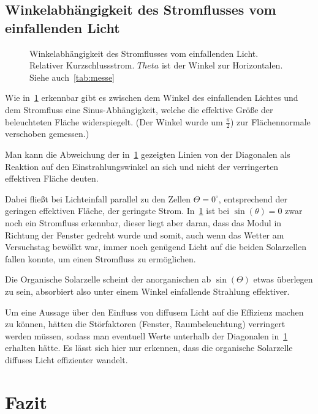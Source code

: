 \documentclass[slug=SZ, room=Hermann-Krone-Bau\,\ Labor\ 1.25,
supervisor=Martin\ Kroll, coursedate=14.\ 11.\ 2019]{../../Lab_Report_LaTeX/lab_report}
\begin{document}
\subsection{Winkelabhängigkeit des Stromflusses vom einfallenden Licht}
\label{sec:winkel}

\begin{figure}[H]\centering
        
        \caption{Winkelabhängigkeit des Stromflusses vom einfallenden
          Licht. Relativer Kurzschlussstrom. \(Theta\)  ist der Winkel
          zur Horizontalen. Siehe auch~\ref{tab:messe}}
        \label{fig:winkel}
\end{figure}

Wie in~\ref{fig:winkel} erkennbar gibt es zwischen dem Winkel des
einfallenden Lichtes und dem Stromfluss eine Sinus-Abhängigkeit,
welche die effektive Gr\"o\ss{}e der beleuchteten Fl\"ache
widerspiegelt. (Der Winkel wurde um \(\frac{\pi}{2}\)) zur
Fl\"achennormale verschoben gemessen.)

Man kann die Abweichung der in~\ref{fig:winkel} gezeigten Linien von
der Diagonalen als Reaktion auf den Einstrahlungswinkel an sich und
nicht der verringerten effektiven Fl\"ache deuten.

Dabei flie\ss{}t bei Lichteinfall parallel zu den Zellen
\(\Theta=0^\circ\), entsprechend der geringen effektiven Fl\"ache, der
geringste Strom.
In~\ref{fig:winkel} ist bei \(\sin(\theta) = 0\) zwar noch ein
Stromfluss erkennbar, dieser liegt aber daran, dass das Modul in
Richtung der Fenster gedreht wurde und somit, auch wenn das Wetter am
Versuchstag bewölkt war, immer noch genügend Licht auf die beiden
Solarzellen fallen konnte, um einen Stromfluss zu ermöglichen.

Die Organische Solarzelle scheint der anorganischen ab
\(\sin(\Theta)\) etwas \"uberlegen
zu sein, absorbiert also unter einem Winkel einfallende Strahlung
effektiver.

Um eine Aussage \"uber den Einfluss von diffusem Licht auf die
Effizienz machen zu k\"onnen, h\"atten die St\"orfaktoren (Fenster,
Raumbeleuchtung) verringert werden m\"ussen, sodass man eventuell
Werte unterhalb der Diagonalen in~\ref{fig:winkel} erhalten
h\"atte.  Es l\"asst sich hier nur erkennen, dass die organische
Solarzelle diffuses Licht effizienter wandelt.

\section{Fazit}
\label{sec:fazit}
\end{document}
